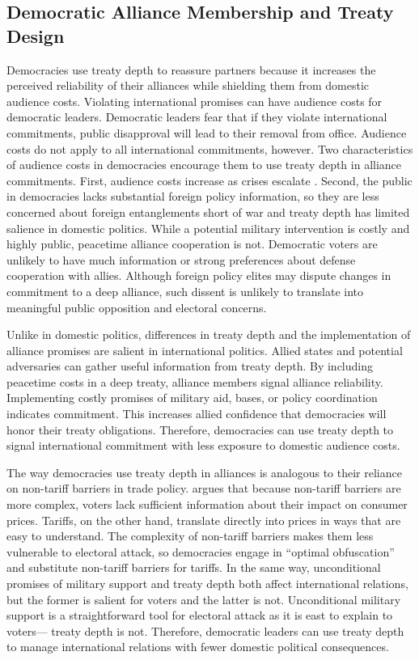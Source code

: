 \documentclass[12pt]{article}
\begin{document}
\subsection{Democratic Alliance Membership and Treaty Design}


Democracies use treaty depth to reassure partners because it increases the perceived reliability of their alliances while shielding them from domestic audience costs. 
Violating international promises can have audience costs for democratic leaders.
Democratic leaders fear that if they violate international commitments, public disapproval will lead to their removal from office.  
Audience costs do not apply to all international commitments, however. 
Two characteristics of audience costs in democracies encourage them to use treaty depth in alliance commitments.  
First, audience costs increase as crises escalate \citep{Tomz2007}. 
Second, the public in democracies lacks substantial foreign policy information, so they are less concerned about foreign entanglements short of war and treaty depth has limited salience in domestic politics. 
While a potential military intervention is costly and highly public, peacetime alliance cooperation is not.  
Democratic voters are unlikely to have much information or strong preferences about defense cooperation with allies. 
Although foreign policy elites may dispute changes in commitment to a deep alliance, such dissent is unlikely to translate 
into meaningful public opposition and electoral concerns.


Unlike in domestic politics, differences in treaty depth and the implementation of alliance promises are salient in international politics. 
Allied states and potential adversaries can gather useful information from treaty depth. 
By including peacetime costs in a deep treaty, alliance members signal alliance reliability. 
Implementing costly promises of military aid, bases, or policy coordination indicates commitment. 
This increases allied confidence that democracies will honor their treaty obligations. 
Therefore, democracies can use treaty depth to signal international commitment with less exposure to domestic audience costs. 


The way democracies use treaty depth in alliances is analogous to their reliance on non-tariff barriers in trade policy.
\citet{Kono2006} argues that because non-tariff barriers are more complex, voters lack sufficient information about their impact on consumer prices.
Tariffs, on the other hand, translate directly into prices in ways that are easy to understand.
The complexity of non-tariff barriers makes them less vulnerable to electoral attack, so democracies engage in ``optimal obfuscation'' and substitute non-tariff barriers for tariffs. 
In the same way, unconditional promises of military support and treaty depth both affect international relations, but the former is salient for voters and the latter is not. 
Unconditional military support is a straightforward tool for electoral attack as it is east to explain to voters--- treaty depth is not. 
Therefore, democratic leaders can use treaty depth to manage international relations with fewer domestic political consequences.
\end{document}
